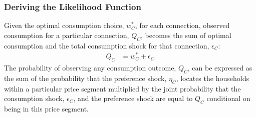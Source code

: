 \documentclass[12pt]{article}
\begin{document}
\subsubsection{Deriving the Likelihood Function}

Given the optimal consumption choice, $w^{*}_C$, for each connection, observed consumption for a particular connection, $Q_C$, becomes the sum of optimal consumption and the total consumption shock for that connection, $\epsilon_C$:
\begin{align}\label{equation:observeddemand}
Q_C &= w^{*}_C + \epsilon_C
\end{align}
The probability of observing any consumption outcome, $Q_C$, can be expressed as the sum of the probability that the preference shock, $\eta_C$, locates the households within a particular price segment multiplied by the joint probability that the consumption shock, $\epsilon_C$, and the preference shock are equal to $Q_C$ conditional on being in this price segment.
\end{document}
